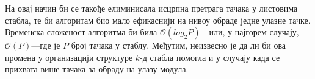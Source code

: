 \documentclass[master]{finthesis}
\newcommand*{\kd}{\texorpdfstring{$k$}{k}-д }
\begin{document}
На овај начин би се такође елиминисала исцрпна претрага тачака у листовима стабла, те би алгоритам био мало ефикаснији на нивоу обраде једне улазне тачке. Временска сложеност алгоритма би била $\mathcal{O}(log_2 P)$---или, у најгорем случају, $\mathcal{O}(P)$---где је $P$ број тачака у стаблу. Међутим, неизвесно је да ли би ова промена у организацији структуре \kd стабла помогла и у случају када се прихвата више тачака за обраду на улазу модула.

\makebibliography

\newrefsection
\nocite{*}
{\let\section\oldsection
\printbibliography[keyword=paper, heading=bibintoc, title={Објављени радови}, resetnumbers]}
\end{document}
